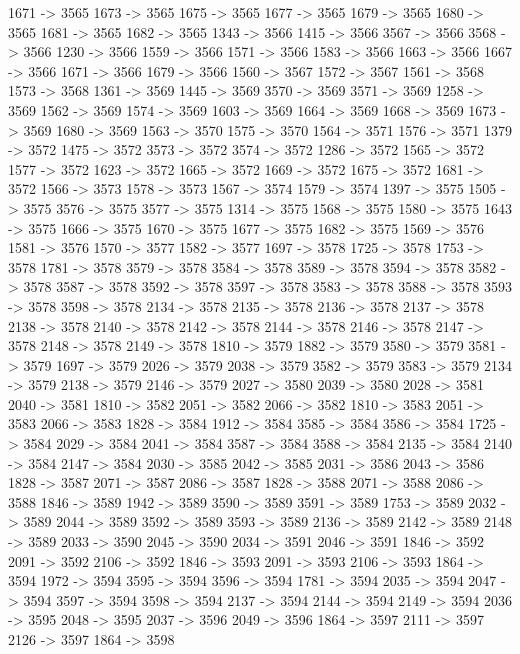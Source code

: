 {	1671 -> 3565
	1673 -> 3565
	1675 -> 3565
	1677 -> 3565
	1679 -> 3565
	1680 -> 3565
	1681 -> 3565
	1682 -> 3565
	1343 -> 3566
	1415 -> 3566
	3567 -> 3566
	3568 -> 3566
	1230 -> 3566
	1559 -> 3566
	1571 -> 3566
	1583 -> 3566
	1663 -> 3566
	1667 -> 3566
	1671 -> 3566
	1679 -> 3566
	1560 -> 3567
	1572 -> 3567
	1561 -> 3568
	1573 -> 3568
	1361 -> 3569
	1445 -> 3569
	3570 -> 3569
	3571 -> 3569
	1258 -> 3569
	1562 -> 3569
	1574 -> 3569
	1603 -> 3569
	1664 -> 3569
	1668 -> 3569
	1673 -> 3569
	1680 -> 3569
	1563 -> 3570
	1575 -> 3570
	1564 -> 3571
	1576 -> 3571
	1379 -> 3572
	1475 -> 3572
	3573 -> 3572
	3574 -> 3572
	1286 -> 3572
	1565 -> 3572
	1577 -> 3572
	1623 -> 3572
	1665 -> 3572
	1669 -> 3572
	1675 -> 3572
	1681 -> 3572
	1566 -> 3573
	1578 -> 3573
	1567 -> 3574
	1579 -> 3574
	1397 -> 3575
	1505 -> 3575
	3576 -> 3575
	3577 -> 3575
	1314 -> 3575
	1568 -> 3575
	1580 -> 3575
	1643 -> 3575
	1666 -> 3575
	1670 -> 3575
	1677 -> 3575
	1682 -> 3575
	1569 -> 3576
	1581 -> 3576
	1570 -> 3577
	1582 -> 3577
	1697 -> 3578
	1725 -> 3578
	1753 -> 3578
	1781 -> 3578
	3579 -> 3578
	3584 -> 3578
	3589 -> 3578
	3594 -> 3578
	3582 -> 3578
	3587 -> 3578
	3592 -> 3578
	3597 -> 3578
	3583 -> 3578
	3588 -> 3578
	3593 -> 3578
	3598 -> 3578
	2134 -> 3578
	2135 -> 3578
	2136 -> 3578
	2137 -> 3578
	2138 -> 3578
	2140 -> 3578
	2142 -> 3578
	2144 -> 3578
	2146 -> 3578
	2147 -> 3578
	2148 -> 3578
	2149 -> 3578
	1810 -> 3579
	1882 -> 3579
	3580 -> 3579
	3581 -> 3579
	1697 -> 3579
	2026 -> 3579
	2038 -> 3579
	3582 -> 3579
	3583 -> 3579
	2134 -> 3579
	2138 -> 3579
	2146 -> 3579
	2027 -> 3580
	2039 -> 3580
	2028 -> 3581
	2040 -> 3581
	1810 -> 3582
	2051 -> 3582
	2066 -> 3582
	1810 -> 3583
	2051 -> 3583
	2066 -> 3583
	1828 -> 3584
	1912 -> 3584
	3585 -> 3584
	3586 -> 3584
	1725 -> 3584
	2029 -> 3584
	2041 -> 3584
	3587 -> 3584
	3588 -> 3584
	2135 -> 3584
	2140 -> 3584
	2147 -> 3584
	2030 -> 3585
	2042 -> 3585
	2031 -> 3586
	2043 -> 3586
	1828 -> 3587
	2071 -> 3587
	2086 -> 3587
	1828 -> 3588
	2071 -> 3588
	2086 -> 3588
	1846 -> 3589
	1942 -> 3589
	3590 -> 3589
	3591 -> 3589
	1753 -> 3589
	2032 -> 3589
	2044 -> 3589
	3592 -> 3589
	3593 -> 3589
	2136 -> 3589
	2142 -> 3589
	2148 -> 3589
	2033 -> 3590
	2045 -> 3590
	2034 -> 3591
	2046 -> 3591
	1846 -> 3592
	2091 -> 3592
	2106 -> 3592
	1846 -> 3593
	2091 -> 3593
	2106 -> 3593
	1864 -> 3594
	1972 -> 3594
	3595 -> 3594
	3596 -> 3594
	1781 -> 3594
	2035 -> 3594
	2047 -> 3594
	3597 -> 3594
	3598 -> 3594
	2137 -> 3594
	2144 -> 3594
	2149 -> 3594
	2036 -> 3595
	2048 -> 3595
	2037 -> 3596
	2049 -> 3596
	1864 -> 3597
	2111 -> 3597
	2126 -> 3597
	1864 -> 3598
}
